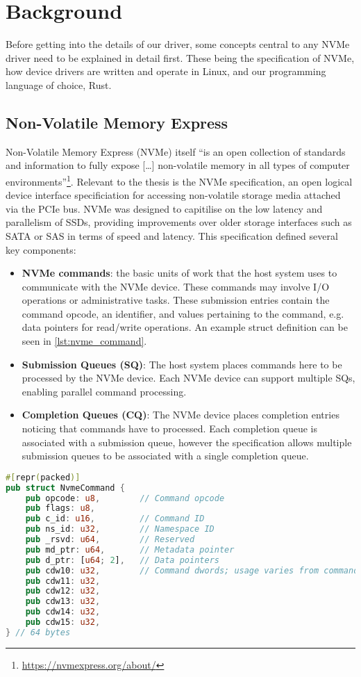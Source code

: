 \chapter{Background}

Before getting into the details of our driver, some concepts central to any NVMe driver need to be explained in detail first. These being the specification of NVMe, how device drivers are written and operate in Linux, and our programming language of choice, Rust.

\section{Non-Volatile Memory Express}
Non-Volatile Memory Express (NVMe) itself ``is an open collection of standards and information to fully expose [\ldots] non-volatile memory in all types of computer environments''\footnote{\url{https://nvmexpress.org/about/}}. Relevant to the thesis is the NVMe specification, an open logical device interface specificiation for accessing non-volatile storage media attached via the PCIe bus. NVMe was designed to capitilise on the low latency and parallelism of SSDs, providing improvements over older storage interfaces such as SATA or SAS in terms of speed and latency. This specification defined several key components:
\begin{itemize}
        \item \textbf{NVMe commands}: the basic units of work that the host system uses to communicate with the NVMe device. These commands may involve I/O operations or administrative tasks. These submission entries contain the command opcode, an identifier, and values pertaining to the command, e.g. data pointers for read/write operations. An example struct definition can be seen in \autoref{lst:nvme_command}.
        \item \textbf{Submission Queues (SQ)}: The host system places commands here to be processed by the NVMe device. Each NVMe device can support multiple SQs, enabling parallel command processing.
        \item \textbf{Completion Queues (CQ)}: The NVMe device places completion entries noticing that commands have to processed. Each completion queue is associated with a submission queue, however the specification allows multiple submission queues to be associated with a single completion queue.
\end{itemize}

\begin{lstlisting}[float,language=Rust,label=lst:nvme_command,caption=The minimal NVMe command defined as a struct in Rust]
#[repr(packed)]
pub struct NvmeCommand {
    pub opcode: u8,        // Command opcode
    pub flags: u8,
    pub c_id: u16,         // Command ID
    pub ns_id: u32,        // Namespace ID
    pub _rsvd: u64,        // Reserved
    pub md_ptr: u64,       // Metadata pointer
    pub d_ptr: [u64; 2],   // Data pointers
    pub cdw10: u32,        // Command dwords; usage varies from command to command
    pub cdw11: u32,
    pub cdw12: u32,
    pub cdw13: u32,
    pub cdw14: u32,
    pub cdw15: u32,
} // 64 bytes
\end{lstlisting}

